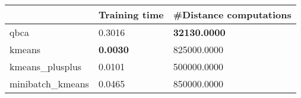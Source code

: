 \begin{table}[htbp]
\centering
\begin{tabular}{lll}
\toprule
 & Training time & #Distance computations \\
\midrule
qbca & 0.3016 & \textbf{32130.0000} \\
kmeans & \textbf{0.0030} & 825000.0000 \\
kmeans_plusplus & 0.0101 & 500000.0000 \\
minibatch_kmeans & 0.0465 & 850000.0000 \\
\bottomrule
\end{tabular}
\end{table}
